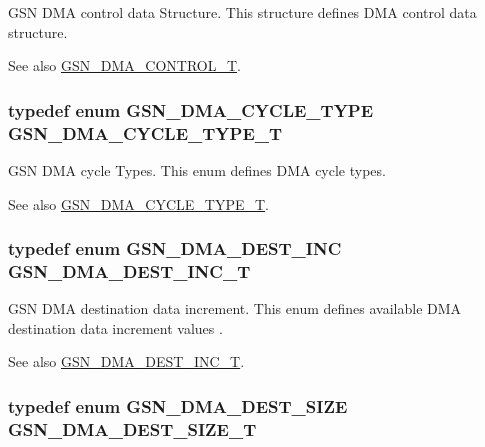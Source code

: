 GSN DMA control data Structure. This structure defines DMA control data structure. 

\begin{DoxySeeAlso}{See also}
\hyperlink{a00645_gad93c4855c9b915891cbdcfcdf2fd0ee5}{GSN\_\-DMA\_\-CONTROL\_\-T}. 
\end{DoxySeeAlso}
\hypertarget{a00645_gab5fced5a7e633077a493c6353edef6de}{
\subsubsection[{GSN\_\-DMA\_\-CYCLE\_\-TYPE\_\-T}]{\setlength{\rightskip}{0pt plus 5cm}typedef enum {\bf GSN\_\-DMA\_\-CYCLE\_\-TYPE}  {\bf GSN\_\-DMA\_\-CYCLE\_\-TYPE\_\-T}}}
\label{a00645_gab5fced5a7e633077a493c6353edef6de}


GSN DMA cycle Types. This enum defines DMA cycle types. 

\begin{DoxySeeAlso}{See also}
\hyperlink{a00645_gab5fced5a7e633077a493c6353edef6de}{GSN\_\-DMA\_\-CYCLE\_\-TYPE\_\-T}. 
\end{DoxySeeAlso}
\hypertarget{a00645_gad729aa817bfd135b589e7c5d589c6c24}{
\subsubsection[{GSN\_\-DMA\_\-DEST\_\-INC\_\-T}]{\setlength{\rightskip}{0pt plus 5cm}typedef enum {\bf GSN\_\-DMA\_\-DEST\_\-INC}  {\bf GSN\_\-DMA\_\-DEST\_\-INC\_\-T}}}
\label{a00645_gad729aa817bfd135b589e7c5d589c6c24}


GSN DMA destination data increment. This enum defines available DMA destination data increment values . 

\begin{DoxySeeAlso}{See also}
\hyperlink{a00645_gad729aa817bfd135b589e7c5d589c6c24}{GSN\_\-DMA\_\-DEST\_\-INC\_\-T}. 
\end{DoxySeeAlso}
\hypertarget{a00645_ga911fde9b2a20ed7759a9d2a8849e34f4}{
\subsubsection[{GSN\_\-DMA\_\-DEST\_\-SIZE\_\-T}]{\setlength{\rightskip}{0pt plus 5cm}typedef enum {\bf GSN\_\-DMA\_\-DEST\_\-SIZE}  {\bf GSN\_\-DMA\_\-DEST\_\-SIZE\_\-T}}}
\label{a00645_ga911fde9b2a20ed7759a9d2a8849e34f4}


